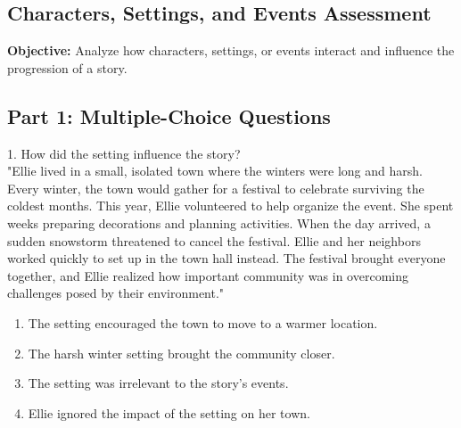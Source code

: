 \documentclass[12pt]{article}
\begin{document}
\subsection*{Characters, Settings, and Events Assessment}
\onehalfspacing

\begin{tcolorbox}[colframe=black!40, colback=gray!0, title=Learning Objective]
\textbf{Objective:} Analyze how characters, settings, or events interact and influence the progression of a story.
\end{tcolorbox}

\subsection*{Part 1: Multiple-Choice Questions}

1. How did the setting influence the story?\\
"Ellie lived in a small, isolated town where the winters were long and harsh. Every winter, the town would gather for a festival to celebrate surviving the coldest months. This year, Ellie volunteered to help organize the event. She spent weeks preparing decorations and planning activities. When the day arrived, a sudden snowstorm threatened to cancel the festival. Ellie and her neighbors worked quickly to set up in the town hall instead. The festival brought everyone together, and Ellie realized how important community was in overcoming challenges posed by their environment."\\
\begin{enumerate}[label=\Alph*.]
    \item The setting encouraged the town to move to a warmer location.  
    \item The harsh winter setting brought the community closer.  
    \item The setting was irrelevant to the story’s events.  
    \item Ellie ignored the impact of the setting on her town.  
\end{enumerate}

\vspace{1cm}
\end{document}
